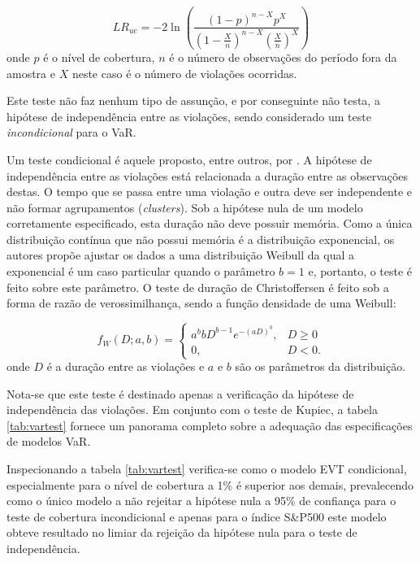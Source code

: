 \documentclass[1p]{elsarticle}
\theoremstyle{definition}
\begin{document}
\begin{equation}
	LR_{uc}=-2\ln\left(\frac{(1-p)^{n-X}p^X}{(1-\frac{X}{n})^{n-X}(\frac{X}{n})^X}\right)
\end{equation}
onde $p$ é o nível de cobertura, $n$ é o número de observações do período fora da amostra e $X$ neste caso é o número de violações ocorridas.

Este teste não faz nenhum tipo de assunção, e por conseguinte não testa, a hipótese de independência entre as violações, sendo considerado um teste \emph{incondicional} para o VaR.



Um teste condicional é aquele proposto, entre outros, por \cite{Christoffersen2004}. A hipótese de independência entre as violações está relacionada a duração entre as observações destas. O tempo que se passa entre uma violação e outra deve ser independente e não formar agrupamentos (\emph{clusters}). Sob a hipótese nula de um modelo corretamente especificado, esta duração não deve possuir memória. Como a única distribuição contínua que não possui memória é a distribuição exponencial, os autores propõe ajustar os dados a uma distribuição Weibull da qual a exponencial é um caso particular quando o parâmetro $b=1$ e, portanto, o teste é feito sobre este parâmetro. O teste de duração de Christoffersen é feito sob a forma de razão de verossimilhança, sendo a função densidade de uma Weibull:

\begin{equation}
	f_W(D; a, b) = \begin{cases}
	a^b b D^{b-1}e^{-(aD)^b}, &D \geq 0\\
	0,&D<0.
	\end{cases} 
\end{equation}
onde $D$ é a duração entre as violações e $a$ e $b$ são os parâmetros da distribuição.

Nota-se que este teste é destinado apenas a verificação da hipótese de independência das violações. Em conjunto com o teste de Kupiec, a tabela \ref{tab:vartest} fornece um panorama completo sobre a adequação das especificações de modelos VaR.



Inspecionando a tabela \ref{tab:vartest} verifica-se como o modelo EVT condicional, especialmente para o nível de cobertura a 1\% é superior aos demais, prevalecendo como o único modelo a não rejeitar a hipótese nula a 95\% de confiança para o teste de cobertura incondicional e apenas para o índice S\&P500 este modelo obteve resultado no limiar da rejeição da hipótese nula para o teste de independência.
\end{document}
